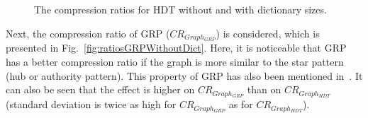 \begin{figure}[h]
	\centering
	\hfill
	\caption{The compression ratios for HDT without and with dictionary sizes.}
\end{figure}

Next, the compression ratio of GRP ($CR_{Graph_{GRP}}$) is considered, which is presented in Fig.~\ref{fig:ratiosGRPWithoutDict}. Here, it is noticeable that GRP has a better compression ratio if the graph is more similar to the star pattern (hub or authority pattern). This property of GRP has also been mentioned in~\cite{maneth}. It can also be seen that the effect is higher on $CR_{Graph_{GRP}}$ than on  $CR_{Graph_{HDT}}$ (standard deviation is twice as high for $CR_{Graph_{GRP}}$ as for $CR_{Graph_{HDT}}$). 

